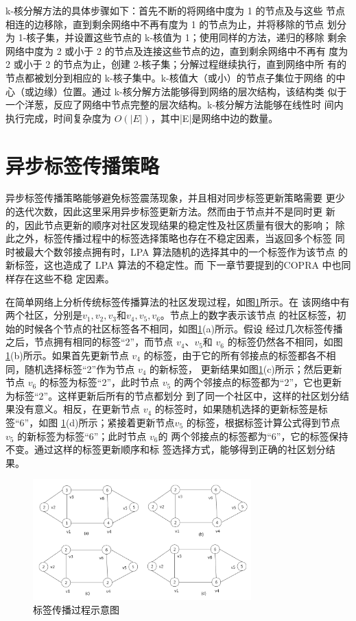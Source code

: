 k-核分解方法的具体步骤如下：首先不断的将网络中度为 1 的节点及与这些
节点相连的边移除，直到剩余网络中不再有度为 1 的节点为止，并将移除的节点
划分为 1-核子集，并设置这些节点的 k-核值为 1；使用同样的方法，递归的移除
剩余网络中度为 2 或小于 2 的节点及连接这些节点的边，直到剩余网络中不再有
度为 2 或小于 2 的节点为止，创建 2-核子集；分解过程继续执行，直到网络中所
有的节点都被划分到相应的 k-核子集中。k-核值大（或小）的节点子集位于网络
的中心（或边缘）位置。通过 k-核分解方法能够得到网络的层次结构，该结构类
似于一个洋葱，反应了网络中节点完整的层次结构。k-核分解方法能够在线性时
间内执行完成，时间复杂度为 $O(|E|)$，其中|E|是网络中边的数量。

\section{异步标签传播策略}

异步标签传播策略能够避免标签震荡现象，并且相对同步标签更新策略需要
更少的迭代次数，因此这里采用异步标签更新方法。然而由于节点并不是同时更
新的，因此节点更新的顺序对社区发现结果的稳定性及社区质量有很大的影响；
除此之外，标签传播过程中的标签选择策略也存在不稳定因素，当返回多个标签
同时被最大个数邻接点拥有时，LPA 算法随机的选择其中的一个标签作为该节点
的新标签，这也造成了 LPA 算法的不稳定性。而 下一章节要提到的COPRA 中也同样存在这些不稳
定因素。

在简单网络上分析传统标签传播算法的社区发现过程，如图\ref{fig:fig3-2}所示。在
该网络中有两个社区，分别是${v_1,v_2,v_3}$和${v_4,v_5,v_6}$。节点上的数字表示该节点
的社区标签，初始的时候各个节点的社区标签各不相同，如图\ref{fig:fig3-2}(a)所示。假设
经过几次标签传播之后，节点拥有相同的标签“2”，而节点 $v_4$、$v_5$和 $v_6$
的标签仍然各不相同，如图\ref{fig:fig3-2}(b)所示。如果首先更新节点 $v_4$
的标签，由于它的所有邻接点的标签都各不相同，随机选择标签“2”作为节点 $v_4$
的新标签，
更新结果如图\ref{fig:fig3-2}(c)所示；然后更新节点 $v_6$
的标签为标签“2”，此时节点 $v_5$
的两个邻接点的标签都为“2”，它也更新为标签“2”。这样更新后所有的节点都划分
到了同一个社区中，这样的社区划分结果没有意义。相反，在更新节点 $v_4$
的标签时，如果随机选择的更新标签是标签“6”，如图 \ref{fig:fig3-2}(d)所示；紧接着更新节点$v_5$
的标签，根据标签计算公式得到节点 $v_5$
的新标签为标签“6”；此时节点 $v_6$的
两个邻接点的标签都为“6”，它的标签保持不变。通过这样的标签更新顺序和标
签选择方式，能够得到正确的社区划分结果。

\begin{figure}
  \centering
  \includegraphics[width=0.75\textwidth]{figures/fig3-2}
  \caption{标签传播过程示意图}\label{fig:fig3-2}
\end{figure}

